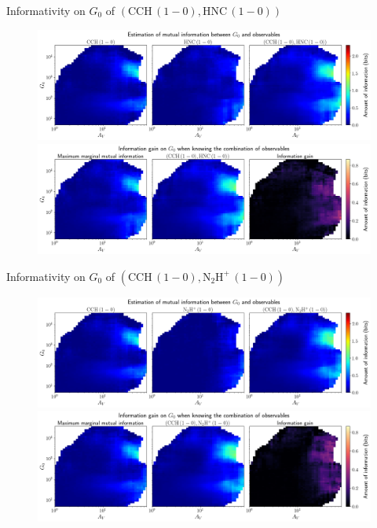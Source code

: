 \documentclass{beamer}
\begin{document}
\begin{frame}{Informativity on $G_0$ of $\left(\mathrm{CCH\,(1-0)},\mathrm{HNC\,(1-0)}\right)$}
    \begin{figure}
        \centering
        \includegraphics[width=0.95\linewidth]{../mi/g0__cch10_hnc10_mi.png}
        \vfill
        \includegraphics[width=0.95\linewidth]{../mi/g0__cch10_hnc10_mi_gain.png}
    \end{figure}
\end{frame}

\begin{frame}{Informativity on $G_0$ of $\left(\mathrm{CCH\,(1-0)},\mathrm{N_2H^+\,(1-0)}\right)$}
    \begin{figure}
        \centering
        \includegraphics[width=0.95\linewidth]{../mi/g0__cch10_n2hp10_mi.png}
        \vfill
        \includegraphics[width=0.95\linewidth]{../mi/g0__cch10_n2hp10_mi_gain.png}
    \end{figure}
\end{frame}
\end{document}
